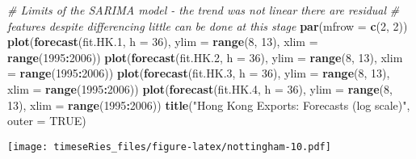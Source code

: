 \documentclass[]{book}
\newenvironment{Shaded}{\begin{snugshade}}{\end{snugshade}}
\newcommand{\KeywordTok}[1]{\textcolor[rgb]{0.13,0.29,0.53}{\textbf{#1}}}
\newcommand{\DataTypeTok}[1]{\textcolor[rgb]{0.13,0.29,0.53}{#1}}
\newcommand{\DecValTok}[1]{\textcolor[rgb]{0.00,0.00,0.81}{#1}}
\newcommand{\StringTok}[1]{\textcolor[rgb]{0.31,0.60,0.02}{#1}}
\newcommand{\CommentTok}[1]{\textcolor[rgb]{0.56,0.35,0.01}{\textit{#1}}}
\newcommand{\OtherTok}[1]{\textcolor[rgb]{0.56,0.35,0.01}{#1}}
\newcommand{\OperatorTok}[1]{\textcolor[rgb]{0.81,0.36,0.00}{\textbf{#1}}}
\newcommand{\NormalTok}[1]{#1}
\begin{document}
\begin{Shaded}
\begin{Highlighting}[]
\CommentTok{# Limits of the SARIMA model - the trend was not linear there are residual}
\CommentTok{# features despite differencing little can be done at this stage}
\KeywordTok{par}\NormalTok{(}\DataTypeTok{mfrow =} \KeywordTok{c}\NormalTok{(}\DecValTok{2}\NormalTok{, }\DecValTok{2}\NormalTok{))}
\KeywordTok{plot}\NormalTok{(}\KeywordTok{forecast}\NormalTok{(fit.HK.}\DecValTok{1}\NormalTok{, }\DataTypeTok{h =} \DecValTok{36}\NormalTok{), }\DataTypeTok{ylim =} \KeywordTok{range}\NormalTok{(}\DecValTok{8}\NormalTok{, }\DecValTok{13}\NormalTok{), }\DataTypeTok{xlim =} \KeywordTok{range}\NormalTok{(}\DecValTok{1995}\OperatorTok{:}\DecValTok{2006}\NormalTok{))}
\KeywordTok{plot}\NormalTok{(}\KeywordTok{forecast}\NormalTok{(fit.HK.}\DecValTok{2}\NormalTok{, }\DataTypeTok{h =} \DecValTok{36}\NormalTok{), }\DataTypeTok{ylim =} \KeywordTok{range}\NormalTok{(}\DecValTok{8}\NormalTok{, }\DecValTok{13}\NormalTok{), }\DataTypeTok{xlim =} \KeywordTok{range}\NormalTok{(}\DecValTok{1995}\OperatorTok{:}\DecValTok{2006}\NormalTok{))}
\KeywordTok{plot}\NormalTok{(}\KeywordTok{forecast}\NormalTok{(fit.HK.}\DecValTok{3}\NormalTok{, }\DataTypeTok{h =} \DecValTok{36}\NormalTok{), }\DataTypeTok{ylim =} \KeywordTok{range}\NormalTok{(}\DecValTok{8}\NormalTok{, }\DecValTok{13}\NormalTok{), }\DataTypeTok{xlim =} \KeywordTok{range}\NormalTok{(}\DecValTok{1995}\OperatorTok{:}\DecValTok{2006}\NormalTok{))}
\KeywordTok{plot}\NormalTok{(}\KeywordTok{forecast}\NormalTok{(fit.HK.}\DecValTok{4}\NormalTok{, }\DataTypeTok{h =} \DecValTok{36}\NormalTok{), }\DataTypeTok{ylim =} \KeywordTok{range}\NormalTok{(}\DecValTok{8}\NormalTok{, }\DecValTok{13}\NormalTok{), }\DataTypeTok{xlim =} \KeywordTok{range}\NormalTok{(}\DecValTok{1995}\OperatorTok{:}\DecValTok{2006}\NormalTok{))}
\KeywordTok{title}\NormalTok{(}\StringTok{"Hong Kong Exports: Forecasts (log scale)"}\NormalTok{, }\DataTypeTok{outer =} \OtherTok{TRUE}\NormalTok{)}
\end{Highlighting}
\end{Shaded}

\texttt{[image: timeseRies\_files/figure-latex/nottingham-10.pdf]}
\end{document}
